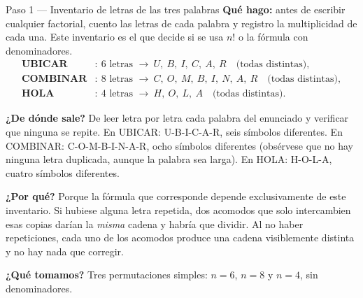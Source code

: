 \documentclass[11pt]{article}
\begin{document}
\begin{paso}{Paso 1 --- Inventario de letras de las tres palabras}
\textbf{Qué hago:} antes de escribir cualquier factorial, cuento las letras de cada palabra y registro la
multiplicidad de cada una. Este inventario es el que decide si se usa $n!$ o la fórmula con denominadores.
\[
\begin{aligned}
\textbf{UBICAR}&:\ 6 \text{ letras } \to\ U,\ B,\ I,\ C,\ A,\ R \quad\text{(todas distintas)},\\
\textbf{COMBINAR}&:\ 8 \text{ letras } \to\ C,\ O,\ M,\ B,\ I,\ N,\ A,\ R \quad\text{(todas distintas)},\\
\textbf{HOLA}&:\ 4 \text{ letras } \to\ H,\ O,\ L,\ A \quad\text{(todas distintas)}.
\end{aligned}
\]

\textbf{¿De dónde sale?} De leer letra por letra cada palabra del enunciado y verificar que ninguna se
repite. En UBICAR: U-B-I-C-A-R, seis símbolos diferentes. En COMBINAR: C-O-M-B-I-N-A-R, ocho símbolos
diferentes (obsérvese que no hay ninguna letra duplicada, aunque la palabra sea larga). En HOLA: H-O-L-A,
cuatro símbolos diferentes.

\textbf{¿Por qué?} Porque la fórmula que corresponde depende exclusivamente de este inventario. Si hubiese
alguna letra repetida, dos acomodos que solo intercambien esas copias darían la \emph{misma} cadena y
habría que dividir. Al no haber repeticiones, cada uno de los acomodos produce una cadena visiblemente
distinta y no hay nada que corregir.

\textbf{¿Qué tomamos?} Tres permutaciones simples: $n=6$, $n=8$ y $n=4$, sin denominadores.
\end{paso}
\end{document}
